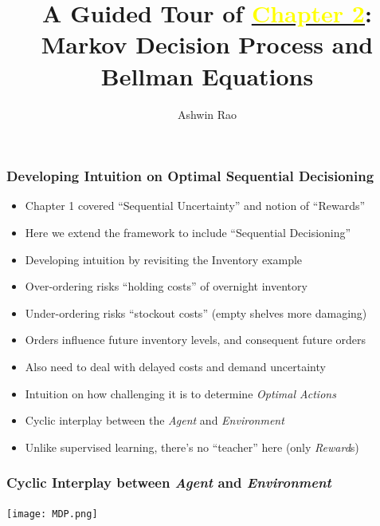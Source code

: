 \documentclass[handout]{beamer}
\title[MDP Chapter]{A Guided Tour of \href{http://stanford.edu/~ashlearn/RLForFinanceBook/book.pdf}{\underline{\textcolor{yellow}{Chapter 2}}}: \\  Markov Decision Process and Bellman Equations} %
\author{Ashwin Rao} %
\institute[Stanford] %
{ICME, Stanford University
}
\date %
\begin{document}
\lstset{language=Python}  
\begin{frame}
\titlepage %
\end{frame}


\begin{frame}
\frametitle{Developing Intuition on Optimal Sequential Decisioning}
\pause
\begin{itemize}[<+->]
\item Chapter 1 covered ``Sequential Uncertainty'' and notion of ``Rewards''
\item Here we extend the framework to include ``Sequential Decisioning''
\item Developing intuition by revisiting the Inventory example
\item Over-ordering risks ``holding costs'' of overnight inventory
\item Under-ordering risks ``stockout costs'' (empty shelves more damaging)
\item Orders influence future inventory levels, and consequent future orders
\item Also need to deal with delayed costs and demand uncertainty
\item Intuition on how challenging it is to determine {\em Optimal Actions}
\item Cyclic interplay between the {\em Agent} and {\em Environment}
\item Unlike supervised learning, there's no ``teacher'' here (only {\em Reward}s)
\end{itemize}
\end{frame}


\begin{frame}
\frametitle{Cyclic Interplay between {\em Agent} and {\em Environment}}
\texttt{[image: MDP.png]}
\end{frame}
\end{document}
